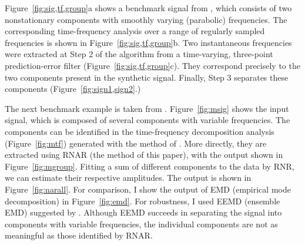 Figure~\ref{fig:sig,tf,group}a shows a benchmark signal from \cite{guochang2011},
which consists of two nonstationary components with smoothly varying
(par\-a\-bolic) frequencies. The corresponding time-freq\-u\-ency analysis
over a range of regularly sampled frequencies is shown in
Figure~\ref{fig:sig,tf,group}b. Two instantaneous frequencies were extracted at
Step 2 of the algorithm from a time-varying, three-point prediction-error
filter (Figure~\ref{fig:sig,tf,group}c). They correspond
precisely to the two components present in the synthetic
signal. Finally, Step 3 separates these components
(Figure~\ref{fig:sign1,sign2}.)



The next benchmark example is taken from
\cite{henry}. Figure~\ref{fig:msig} shows the input signal, which is
composed of several components with variable frequencies. The
components can be identified in the time-frequency decomposition
analysis (Figure~\ref{fig:mtf}) generated with the method of
\cite{guochang2011}. More directly, they are extracted using RNAR (the
method of this paper), with the output shown in
Figure~\ref{fig:mgroup}. Fitting a sum of different components to the
data by RNR, we can estimate their respective amplitudes. The output
is shown in Figure~\ref{fig:narall}. For comparison, I show the output
of EMD (empirical mode decomposition) in Figure~\ref{fig:emd}. For
robustness, I used EEMD (ensemble EMD) suggested by
\cite{eemd}. Although EEMD succeeds in separating the signal into
components with variable frequencies, the individual components are
not as meaningful as those identified by RNAR.


